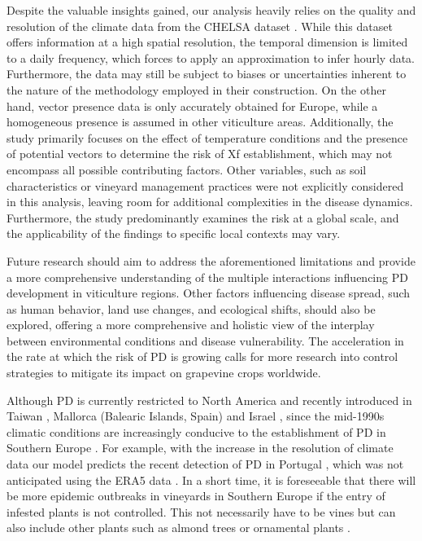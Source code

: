 Despite the valuable insights gained,  our analysis heavily relies on the
quality and resolution of the climate data from the CHELSA dataset
\cite{chelsa-climatologies-2021}. While this dataset offers information at a
high spatial resolution, the temporal dimension is limited to a daily
frequency, which forces to apply an approximation to infer hourly data.
Furthermore, the data may still be subject to biases or uncertainties inherent
to the nature of the methodology employed in their construction. On the other
hand, vector presence data is only accurately obtained for Europe, while a
homogeneous presence is assumed in other viticulture areas. Additionally, the
study primarily focuses on the effect of temperature conditions and the
presence of potential vectors to determine the risk of Xf establishment, which
may not encompass all possible contributing factors. Other variables, such as
soil characteristics or vineyard management practices were not explicitly
considered in this analysis, leaving room for additional complexities in the
disease dynamics. Furthermore, the study predominantly examines the risk at a
global scale, and the applicability of the findings to specific local contexts
may vary.

Future research should aim to address the aforementioned limitations and
provide a more comprehensive understanding of the multiple interactions
influencing PD development  in viticulture regions. Other factors influencing
disease spread, such as human behavior, land use changes, and ecological
shifts, should also be explored, offering a more comprehensive and holistic
view of the interplay between environmental conditions and disease
vulnerability. The acceleration in the rate at which the risk of PD is growing
calls for more research into control strategies to mitigate its impact on
grapevine crops worldwide.

Although PD is currently restricted to North America and recently
introduced in Taiwan \cite{su2013pierce}, Mallorca (Balearic Islands, Spain)
\cite{gomila2019draft,Moralejo2019} and Israel
\cite{zecharia2022xylella}, since the mid-1990s climatic conditions are
increasingly conducive to the establishment of PD in Southern Europe
\cite{GimenezRomero2022_CommsBio}. For example, with the increase in the
resolution of
climate data our model predicts  the recent detection of PD in Portugal
\cite{loureiro2023xylella}, which was not anticipated using the ERA5 data
\cite{GimenezRomero2022_CommsBio}. In a short time, it is foreseeable that
there will
be more epidemic outbreaks in vineyards in Southern Europe if the entry of
infested plants is not controlled. This not necessarily have to be vines but
can also include other plants such as almond trees or ornamental plants
\cite{Moralejo2020}.


